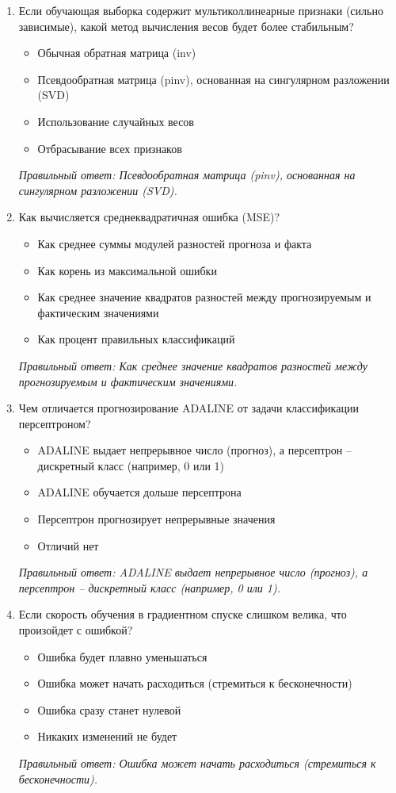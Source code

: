 \begin{enumerate}[label=\textbf{\arabic*.}, leftmargin=0pt, itemsep=1.2em]
\item Если обучающая выборка содержит мультиколлинеарные признаки (сильно зависимые), какой метод вычисления весов будет более стабильным?
\begin{itemize}[label=$\square$, leftmargin=1.5cm, itemsep=0.2em, topsep=0.3em]
\item Обычная обратная матрица (inv)
\item Псевдообратная матрица (pinv), основанная на сингулярном разложении (SVD)
\item Использование случайных весов
\item Отбрасывание всех признаков
\end{itemize}
{\small\textit{Правильный ответ: Псевдообратная матрица (pinv), основанная на сингулярном разложении (SVD).}}

\item Как вычисляется среднеквадратичная ошибка (MSE)?
\begin{itemize}[label=$\square$, leftmargin=1.5cm, itemsep=0.2em, topsep=0.3em]
\item Как среднее суммы модулей разностей прогноза и факта
\item Как корень из максимальной ошибки
\item Как среднее значение квадратов разностей между прогнозируемым и фактическим значениями
\item Как процент правильных классификаций
\end{itemize}
{\small\textit{Правильный ответ: Как среднее значение квадратов разностей между прогнозируемым и фактическим значениями.}}

\item Чем отличается прогнозирование ADALINE от задачи классификации персептроном?
\begin{itemize}[label=$\square$, leftmargin=1.5cm, itemsep=0.2em, topsep=0.3em]
\item ADALINE выдает непрерывное число (прогноз), а персептрон – дискретный класс (например, 0 или 1)
\item ADALINE обучается дольше персептрона
\item Персептрон прогнозирует непрерывные значения
\item Отличий нет
\end{itemize}
{\small\textit{Правильный ответ: ADALINE выдает непрерывное число (прогноз), а персептрон – дискретный класс (например, 0 или 1).}}

\item Если скорость обучения в градиентном спуске слишком велика, что произойдет с ошибкой?
\begin{itemize}[label=$\square$, leftmargin=1.5cm, itemsep=0.2em, topsep=0.3em]
\item Ошибка будет плавно уменьшаться
\item Ошибка может начать расходиться (стремиться к бесконечности)
\item Ошибка сразу станет нулевой
\item Никаких изменений не будет
\end{itemize}
{\small\textit{Правильный ответ: Ошибка может начать расходиться (стремиться к бесконечности).}}


\end{enumerate}
